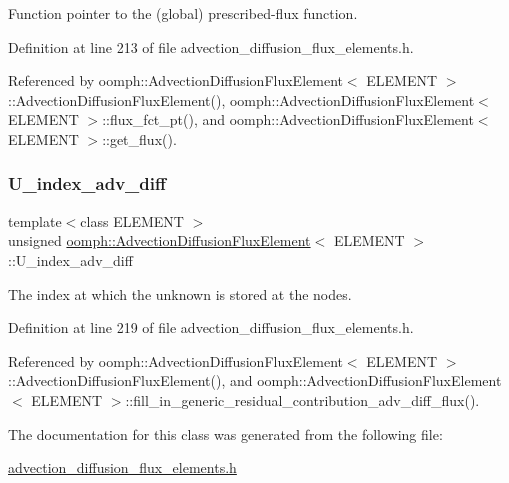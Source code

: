 Function pointer to the (global) prescribed-\/flux function. 



Definition at line 213 of file advection\+\_\+diffusion\+\_\+flux\+\_\+elements.\+h.



Referenced by oomph\+::\+Advection\+Diffusion\+Flux\+Element$<$ E\+L\+E\+M\+E\+N\+T $>$\+::\+Advection\+Diffusion\+Flux\+Element(), oomph\+::\+Advection\+Diffusion\+Flux\+Element$<$ E\+L\+E\+M\+E\+N\+T $>$\+::flux\+\_\+fct\+\_\+pt(), and oomph\+::\+Advection\+Diffusion\+Flux\+Element$<$ E\+L\+E\+M\+E\+N\+T $>$\+::get\+\_\+flux().

\mbox{\label{classoomph_1_1AdvectionDiffusionFluxElement_a70092d79adb469c7b8fb34b1c31903a1}} 
\subsubsection{\texorpdfstring{U\+\_\+index\+\_\+adv\+\_\+diff}{U\_index\_adv\_diff}}
{\footnotesize\ttfamily template$<$class E\+L\+E\+M\+E\+NT $>$ \\
unsigned \hyperlink{classoomph_1_1AdvectionDiffusionFluxElement}{oomph\+::\+Advection\+Diffusion\+Flux\+Element}$<$ E\+L\+E\+M\+E\+NT $>$\+::U\+\_\+index\+\_\+adv\+\_\+diff\hspace{0.3cm}{\ttfamily [private]}}



The index at which the unknown is stored at the nodes. 



Definition at line 219 of file advection\+\_\+diffusion\+\_\+flux\+\_\+elements.\+h.



Referenced by oomph\+::\+Advection\+Diffusion\+Flux\+Element$<$ E\+L\+E\+M\+E\+N\+T $>$\+::\+Advection\+Diffusion\+Flux\+Element(), and oomph\+::\+Advection\+Diffusion\+Flux\+Element$<$ E\+L\+E\+M\+E\+N\+T $>$\+::fill\+\_\+in\+\_\+generic\+\_\+residual\+\_\+contribution\+\_\+adv\+\_\+diff\+\_\+flux().



The documentation for this class was generated from the following file\+:\begin{DoxyCompactItemize}
\item 
\hyperlink{advection__diffusion__flux__elements_8h}{advection\+\_\+diffusion\+\_\+flux\+\_\+elements.\+h}\end{DoxyCompactItemize}
